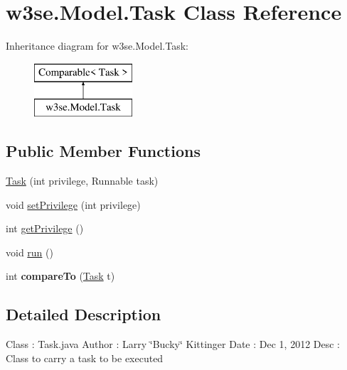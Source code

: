 \hypertarget{classw3se_1_1_model_1_1_task}{\section{w3se.\-Model.\-Task Class Reference}
\label{classw3se_1_1_model_1_1_task}
}
Inheritance diagram for w3se.\-Model.\-Task\-:\begin{figure}[H]
\begin{center}
\leavevmode
\includegraphics[height=2.000000cm]{classw3se_1_1_model_1_1_task}
\end{center}
\end{figure}
\subsection*{Public Member Functions}
\begin{DoxyCompactItemize}
\item 
\hyperlink{classw3se_1_1_model_1_1_task_aff2a114b2602f174aa443547e1fdf1b1}{Task} (int privilege, Runnable task)
\item 
void \hyperlink{classw3se_1_1_model_1_1_task_a28f17e2d7136ac7ada488cb73f12f86f}{set\-Privilege} (int privilege)
\item 
int \hyperlink{classw3se_1_1_model_1_1_task_a94074b2a5717d1a324561b97655f8479}{get\-Privilege} ()
\item 
void \hyperlink{classw3se_1_1_model_1_1_task_a483bd48a6f3c81d02028cc66e800ec66}{run} ()
\item 
\hypertarget{classw3se_1_1_model_1_1_task_a5f44bbaa61a3b91038801e5f334c0544}{int {\bfseries compare\-To} (\hyperlink{classw3se_1_1_model_1_1_task}{Task} t)}\label{classw3se_1_1_model_1_1_task_a5f44bbaa61a3b91038801e5f334c0544}

\end{DoxyCompactItemize}


\subsection{Detailed Description}
Class \-: Task.\-java Author \-: Larry \char`\"{}\-Bucky\char`\"{} Kittinger Date \-: Dec 1, 2012 Desc \-: Class to carry a task to be executed 


